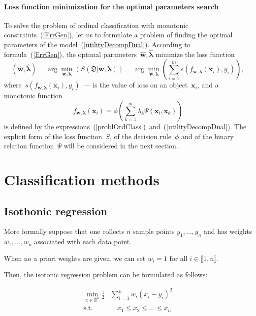 \documentclass[12pt,preprint]{elsarticle}
\newcommand{\blambda}{\boldsymbol{\lambda}}
\newcommand{\bx}{\mathbf{x}}
\newcommand{\bw}{\mathbf{w}}
\begin{document}
\paragraph{Loss function minimization for the optimal parameters search}
To solve the problem of ordinal classification with monotonic constraints~(\ref{ErrGen}), let us to formulate a problem of finding the optimal parameters of the model~(\ref{utilityDecompDual}).
According to formula~(\ref{ErrGen}), the optimal parameters~$\hat{\bw},\hat{\blambda}$ minimize the loss function
\[
(\hat{\bw},\hat{\blambda})=\arg\min\limits_{\bw,\blambda}\left(S(\mathfrak{D}|\bw,\blambda)\right)=\arg\min\limits_{\bw,\blambda}\left(\sum\limits_{i=1}^m{s(f_{\bw,\blambda}(\bx_i), y_i)}\right),
\]
where~$s(f_{\bw,\blambda}(\bx_i), y_i)$~--- is the value of loss on an object~$\bx_i$, and a monotonic function
\begin{equation}
f_{\bw,\blambda}(\bx_i) = \phi\left(\sum\limits_{k=1}^m \lambda_{k} \Psi(\bx_i, \bx_k)\right)
\label{ordClassMdl}
\end{equation}
is defined by the expressions~(\ref{problOrdClass})~and~(\ref{utilityDecompDual}).
The explicit form of the loss function~$S$, of the decision rule~$\phi$ and of the binary relation function~$\Psi$ will be considered in the next section.
\section{Classification methods}
\subsection{Isothonic regression}


More formally suppose that one collects $n$ sample points $y_1,\dots, y_n$ and has weights $w_1, \dots, w_n$ associated with each data point.

When no a priori weights are given, we can set $w_i = 1$ for all $i \in \llbracket 1, n \rrbracket$.

Then, the isotonic regression problem can be formulated as follows:

\begin{align}
\min_{x \in \mathbb{R}^n}
\frac{1}{2}
& \sum_{i=1}^{n} w_i (x_i - y_i)^2 \\
\text{s.t.} & \quad x_1 \leq x_2 \leq \ldots \leq x_n \nonumber
\end{align}
\end{document}
